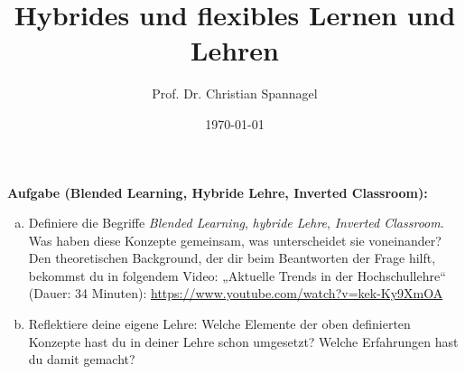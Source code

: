 \documentclass{../cssheet}
\title{Hybrides und flexibles Lernen und Lehren}
\author{Prof. Dr. Christian Spannagel}
\date{\today}
\begin{document}
\printtitle
\printsubtitle

\textbf{Aufgabe (Blended Learning, Hybride Lehre, Inverted Classroom):} 

\begin{enumerate}[a)]
\item Definiere die Begriffe \emph{Blended Learning}, \emph{hybride Lehre}, \emph{Inverted Classroom}. Was haben diese Konzepte gemeinsam, was unterscheidet sie voneinander?
Den theoretischen Background, der dir beim Beantworten der Frage hilft, bekommst du in folgendem Video: „Aktuelle Trends in der Hochschullehre“ (Dauer: 34 Minuten): \url{https://www.youtube.com/watch?v=kek-Ky9XmOA}
\item Reflektiere deine eigene Lehre: Welche Elemente der oben definierten Konzepte hast du in deiner Lehre schon umgesetzt? Welche Erfahrungen hast du damit gemacht?
\end{enumerate}


%
%







\vspace*{20mm}
\printlicense

\printsocials


\end{document}
